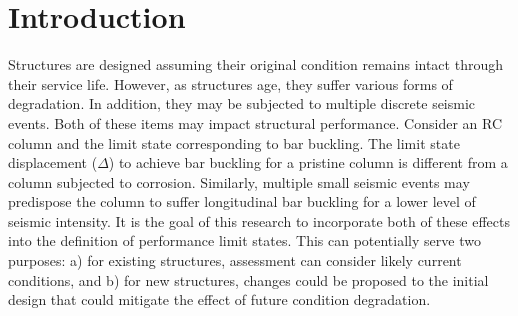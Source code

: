 \chapter{Introduction}
\label{chap-one}

Structures are designed assuming their original condition remains intact through their service life. However, as structures age, they suffer various forms of degradation. In addition, they may be subjected to multiple discrete seismic events. Both of these items may impact  structural performance. Consider an RC column and the limit state corresponding to bar buckling. The limit state displacement ($\Delta$) to achieve bar buckling for a pristine column is different from a column subjected to corrosion. Similarly, multiple small seismic events may predispose the column to suffer longitudinal bar buckling for a lower level of seismic intensity. It is the goal of this research to incorporate both of these effects into the definition of performance limit states. This can potentially serve two purposes: a) for existing structures, assessment can consider likely current conditions, and b) for new structures, changes could be proposed to the initial design that could mitigate the effect of future condition degradation.

